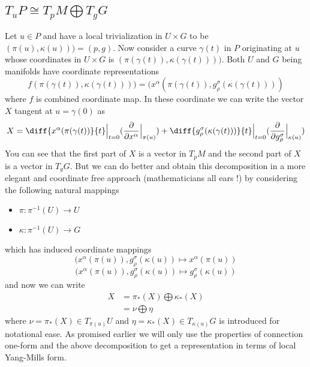 \documentclass[12pt]{article}
\begin{document}
\subsection{$T_{u}P \cong T_{p}M\bigoplus T_{g}G$}{\label{decompose}}
Let $u \in P$ and have a local trivialization in $U\times G$ to be $(\pi(u), \kappa(u))) = (p, g)$. Now consider a curve $\gamma(t)$ in $P$ originating at $u$ whose coordinates in $U\times G$ is $(\pi(\gamma(t)), \kappa(\gamma(t))))$. Both $U$ and $G$ being manifolds have coordinate representations
\[
f(\pi(\gamma(t)), \kappa(\gamma(t)))) = (x^{\alpha}(\pi(\gamma(t)), g^{\sigma}_{\rho}(\kappa(\gamma(t))))
\] where $f$ is combined coordinate map. In these coordinate we can write the vector $X$ tangent at $u = \gamma(0)$ as
\[
X = \diff{x^{\alpha}(\pi(\gamma(t))}{t}\Bigr|_{t=0}(\frac{\partial}{\partial x^{\alpha}}\Bigr|_{\pi(u)}) + \diff{g^{\sigma}_{\rho}(\kappa(\gamma(t)))}{t}\Bigr|_{t=0}(\frac{\partial}{\partial g^{\sigma}_{\rho}}\Bigr|_{\kappa(u)})
\]
You can see that the first part of $X$ is a vector in $T_{p}M$ and the second part of $X$ is a vector in $T_{g}G$. But we can do better and obtain this decomposition in a more elegant and coordinate free approach (mathematicians all ears !) by considering the following natural mappings 
\begin{itemize}
    \item $\pi \colon \pi^{-1}(U) \to U$
    \item $\kappa \colon \pi^{-1}(U) \to G$
\end{itemize} 
which has induced coordinate mappings
\[
(x^{\alpha}(\pi(u)), g^{\sigma}_{\rho}(\kappa(u)) \mapsto x^{\alpha}(\pi(u))
\]
\[
(x^{\alpha}(\pi(u)), g^{\sigma}_{\rho}(\kappa(u)) \mapsto g^{\sigma}_{\rho}(\kappa(u))
\] and now we can write
\begin{align*}
    X &= \pi_{\ast}(X) \bigoplus \kappa_{\ast}(X) \\
      &= \nu \bigoplus \eta
\end{align*} where $\nu = \pi_{\ast}(X) \in T_{\pi(u)}U$ and $\eta = \kappa_{\ast}(X) \in T_{\kappa(u)}G$ is introduced for notational ease. As promised earlier we will only use the properties of connection one-form and the above decomposition to get a representation in terms of local Yang-Mills form.
\end{document}
